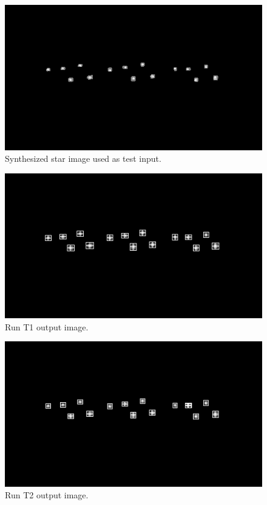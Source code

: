 \documentclass[12pt]{report}
\begin{document}
\begin{figure}[!h]
    \centering
    \includegraphics[scale=1.2]{results/t_in.png}
    \caption{Synthesized star image used as test input.}
    \label{res:t_in}
\end{figure}
\begin{figure}[!h]
    \centering
    \includegraphics[scale=1.2]{results/t0.png}
    \caption{Run T1 output image.}
    \label{res:t0}
\end{figure}
\begin{figure}[!h]
    \centering
    \includegraphics[scale=1.2]{results/t1.png}
    \caption{Run T2 output image.}
    \label{res:t1}
\end{figure}
\end{document}
